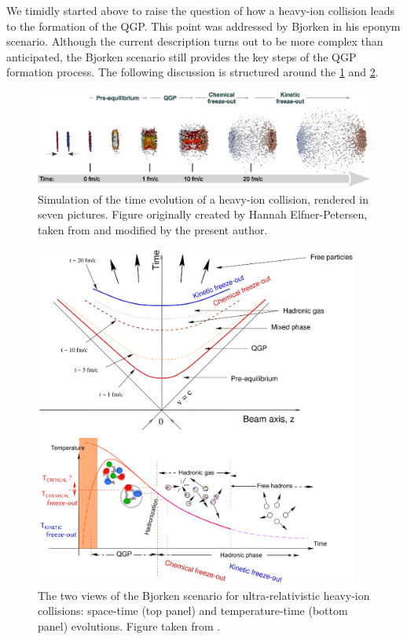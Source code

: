We timidly started above to raise the question of how a heavy-ion collision leads to the formation of the QGP. This point was addressed by Bjorken in his eponym scenario. Although the current description turns out to be more complex than anticipated, the Bjorken scenario still provides the key steps of the QGP formation process. The following discussion is structured around the \figs\ref{fig:PbPbSimu} and \ref{fig:QGPEvol}.\\

\begin{figure}[!p]
	\centering
	\hspace*{-1cm}\includegraphics[width=1.1\textwidth]{Figs/Chapter2/PbPbCollision.eps}
	\caption{Simulation of the time evolution of a heavy-ion collision, rendered in seven pictures. Figure originally created by Hannah Elfner-Petersen, taken from \cite{bernhardBayesianParameterEstimation2018} and modified by the present author.}
	\label{fig:PbPbSimu}
\end{figure}

\begin{figure}[!p]
	\centering
	\includegraphics[width=0.95\textwidth]{Figs/Chapter2/Schema-BjorkenScenario.eps}
	\caption{The two views of the Bjorken scenario for ultra-relativistic heavy-ion collisions: space-time (top panel) and temperature-time (bottom panel) evolutions. Figure taken from \cite{maireTwoViewsBjorken2011}.}
	\label{fig:QGPEvol}
\end{figure}

